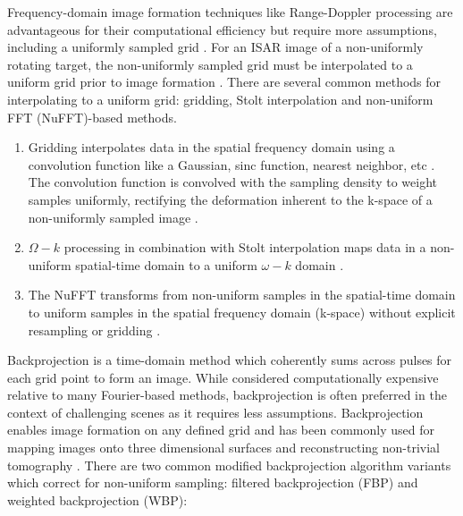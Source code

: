 \documentclass[conference]{IEEEtran}
\begin{document}

Frequency-domain image formation techniques like Range-Doppler processing are advantageous for their computational efficiency but require more assumptions, including a uniformly sampled grid \cite{Malik_2005}. For an ISAR image of a non-uniformly rotating target, the non-uniformly sampled grid must be interpolated to a uniform grid prior to image formation \cite{Malik_2005}. There are several common methods for interpolating to a uniform grid: gridding, Stolt interpolation and non-uniform FFT (NuFFT)-based methods.

\begin{enumerate}
    \item Gridding interpolates data in the spatial frequency domain using a convolution function like a Gaussian, sinc function, nearest neighbor, etc \cite{Malik_2005,Jackson_1991, Pipe_1999}. The convolution function is convolved with the sampling density to weight samples uniformly, rectifying the deformation inherent to the k-space of a non-uniformly sampled image \cite{Malik_2005, Jackson_1991, Pipe_1999}. 
    \item $\Omega-k$ processing in combination with Stolt interpolation maps data in a non-uniform spatial-time domain to a uniform $\omega-k$ domain \cite{Meng_2015, Zhao_2018}. 
    \item The NuFFT transforms from non-uniform samples in the spatial-time domain to uniform samples in the spatial frequency domain (k-space) without explicit resampling or gridding \cite{Subiza_2003}.
\end{enumerate}

Backprojection is a time-domain method which coherently sums across pulses for each grid point to form an image. While considered computationally expensive relative to many Fourier-based methods, backprojection is often preferred in the context of challenging scenes as it requires less assumptions\cite{Zhang_2023}. Backprojection enables image formation on any defined grid and has been commonly used for mapping images onto three dimensional surfaces and reconstructing non-trivial tomography \cite{Ren_2009}. There are two common modified backprojection algorithm variants which correct for non-uniform sampling: filtered backprojection (FBP) and weighted backprojection (WBP):
\end{document}
